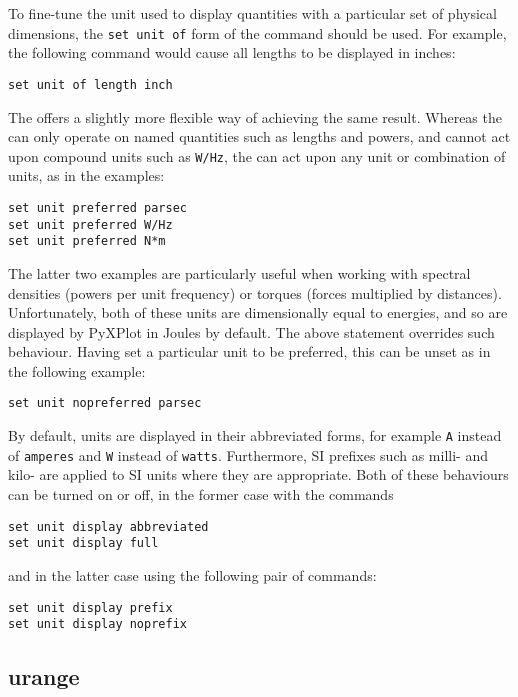 To fine-tune the unit used to display quantities with a particular set of
physical dimensions, the {\tt set unit of} form of the command should be used.
For example, the following command would cause all lengths to be displayed in
inches:

\begin{verbatim}
set unit of length inch
\end{verbatim}

The  offers a slightly more flexible way of
achieving the same result. Whereas the  can only operate
on named quantities such as lengths and powers, and cannot act upon compound
units such as {\tt W/Hz}, the  can act upon any
unit or combination of units, as in the examples:
\begin{verbatim}
set unit preferred parsec
set unit preferred W/Hz
set unit preferred N*m
\end{verbatim}
The latter two examples are particularly useful when working with spectral
densities (powers per unit frequency) or torques (forces multiplied by
distances). Unfortunately, both of these units are dimensionally equal to
energies, and so are displayed by PyXPlot in Joules by default. The above
statement overrides such behaviour. Having set a particular unit to be
preferred, this can be unset as in the following example:
\begin{verbatim}
set unit nopreferred parsec
\end{verbatim}

By default, units are displayed in their abbreviated forms, for example {\tt A}
instead of {\tt amperes} and {\tt W} instead of {\tt watts}. Furthermore, SI
prefixes such as milli- and kilo- are applied to SI units where they are
appropriate. Both of these behaviours can be turned on or off, in the former
case with the commands

\begin{verbatim}
set unit display abbreviated
set unit display full
\end{verbatim}

\noindent and in the latter case using the following pair of commands:

\begin{verbatim}
set unit display prefix
set unit display noprefix
\end{verbatim}


\subsection{urange}

